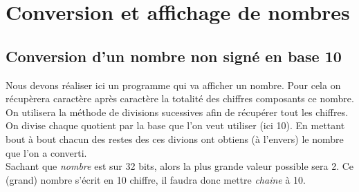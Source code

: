 \section{Conversion et affichage de nombres}
\subsection{Conversion d’un nombre non signé en base 10}
\noindent Nous devons réaliser ici un programme qui va afficher un nombre. Pour cela on récupèrera caractère après caractère la totalité des chiffres composants ce nombre. On utilisera la méthode de divisions sucessives afin de récupérer tout les chiffres. On divise chaque quotient par la base que l'on veut utiliser (ici 10). En mettant bout à bout chacun des restes des ces divions ont obtiens (à l'envers) le nombre que l'on a converti.
\\
Sachant que \textit{nombre} est sur 32 bits, alors la plus grande valeur possible sera 2. Ce (grand) nombre s'écrit en 10 chiffre, il faudra donc mettre \textit{chaine} à 10.

